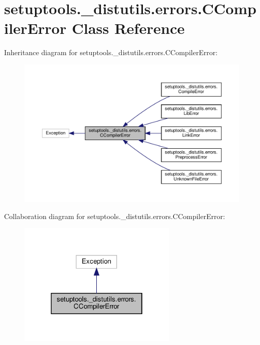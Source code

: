 \hypertarget{classsetuptools_1_1__distutils_1_1errors_1_1CCompilerError}{}\section{setuptools.\+\_\+distutils.\+errors.\+C\+Compiler\+Error Class Reference}
\label{classsetuptools_1_1__distutils_1_1errors_1_1CCompilerError}


Inheritance diagram for setuptools.\+\_\+distutils.\+errors.\+C\+Compiler\+Error\+:
\nopagebreak
\begin{figure}[H]
\begin{center}
\leavevmode
\includegraphics[width=350pt]{classsetuptools_1_1__distutils_1_1errors_1_1CCompilerError__inherit__graph}
\end{center}
\end{figure}


Collaboration diagram for setuptools.\+\_\+distutils.\+errors.\+C\+Compiler\+Error\+:
\nopagebreak
\begin{figure}[H]
\begin{center}
\leavevmode
\includegraphics[width=214pt]{classsetuptools_1_1__distutils_1_1errors_1_1CCompilerError__coll__graph}
\end{center}
\end{figure}


